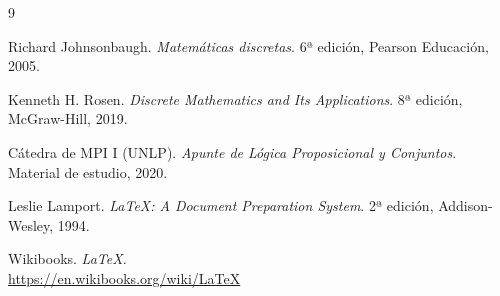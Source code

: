 \begin{thebibliography}{9}

Richard Johnsonbaugh.
\textit{Matemáticas discretas}.
6ª edición, Pearson Educación, 2005.

Kenneth H. Rosen.
\textit{Discrete Mathematics and Its Applications}.
8ª edición, McGraw-Hill, 2019.

Cátedra de MPI I (UNLP).
\textit{Apunte de Lógica Proposicional y Conjuntos}.
Material de estudio, 2020.

Leslie Lamport.
\textit{LaTeX: A Document Preparation System}.
2ª edición, Addison-Wesley, 1994.

Wikibooks.
\textit{LaTeX}. \\
\url{https://en.wikibooks.org/wiki/LaTeX}

\end{thebibliography}



